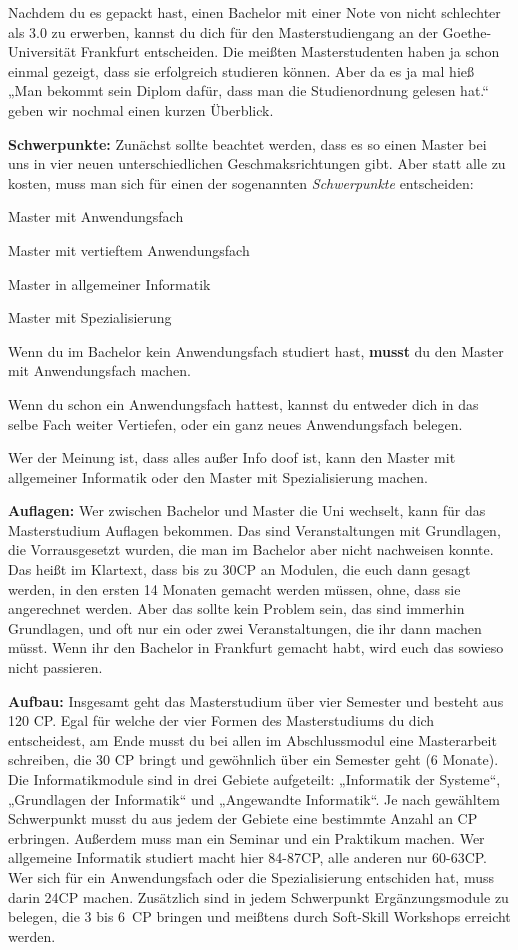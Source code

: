 \spaltenanfang
Nachdem du es gepackt hast, einen Bachelor mit einer Note von nicht schlechter als 3.0 zu erwerben, kannst du dich für den Masterstudiengang an der Goethe-Universität Frankfurt entscheiden.
Die mei{\ss}ten Masterstudenten haben ja schon einmal gezeigt, dass sie
erfolgreich studieren k\"onnen. Aber da es ja mal hie{\ss} „Man bekommt sein Diplom
daf\"ur, dass man die Studienordnung gelesen hat.“ geben wir nochmal einen
kurzen \"Uberblick.

\textbf{Schwerpunkte:}
Zun\"achst sollte beachtet werden, dass es so einen Master bei uns in vier neuen unterschiedlichen Geschmaksrichtungen gibt. Aber statt alle zu kosten, muss man sich f\"ur einen der sogenannten \emph{Schwerpunkte} entscheiden:
\begin{noindEnumerate}
\item Master mit Anwendungsfach
\item Master mit vertieftem Anwendungsfach
\item Master in allgemeiner Informatik
\item Master mit Spezialisierung
\end{noindEnumerate}

Wenn du im Bachelor kein Anwendungsfach studiert hast, \textbf{musst} du den Master mit Anwendungsfach machen.

Wenn du schon ein Anwendungsfach hattest, kannst du entweder dich in das selbe Fach weiter Vertiefen, oder ein ganz neues Anwendungsfach belegen.

Wer der Meinung ist, dass alles au{\ss}er Info doof ist, kann den Master mit allgemeiner Informatik oder den Master mit Spezialisierung machen. 

\textbf{Auflagen:}
Wer zwischen Bachelor und Master die Uni wechselt, kann f\"ur das Masterstudium Auflagen bekommen.
Das sind Veranstaltungen mit Grundlagen, die Vorrausgesetzt wurden, die man im Bachelor aber nicht nachweisen konnte.
Das hei{\ss}t im Klartext, dass bis zu 30CP an Modulen, die euch dann gesagt werden, in den ersten 14 Monaten gemacht werden m\"ussen, ohne, dass sie angerechnet werden. Aber das sollte kein Problem sein, das sind immerhin Grundlagen, und oft nur ein oder zwei Veranstaltungen, die ihr dann machen m\"usst. Wenn ihr den Bachelor in Frankfurt gemacht habt, wird euch das sowieso nicht passieren.

\textbf{Aufbau:}
Insgesamt geht das Masterstudium über vier Semester und besteht aus 120 CP.
Egal für welche der vier Formen des Masterstudiums du dich entscheidest, am Ende musst du bei allen im Abschlussmodul eine Masterarbeit schreiben, die 30 CP bringt und gewöhnlich über ein Semester geht (6 Monate).
Die Informatikmodule sind in drei Gebiete aufgeteilt: „Informatik der Systeme“, „Grundlagen der Informatik“ und „Angewandte Informatik“. Je nach gewähltem Schwerpunkt musst du aus jedem der Gebiete eine bestimmte Anzahl an CP erbringen. Au{\ss}erdem muss man ein Seminar und ein Praktikum machen. Wer allgemeine Informatik studiert macht hier 84-87CP, alle anderen nur 60-63CP.
Wer sich f\"ur ein Anwendungsfach oder die Spezialisierung entschiden hat, muss darin 24CP machen.
Zusätzlich sind in jedem Schwerpunkt Ergänzungsmodule zu belegen, die 3 bis 6~CP bringen und mei{\ss}tens durch Soft-Skill Workshops erreicht werden.

